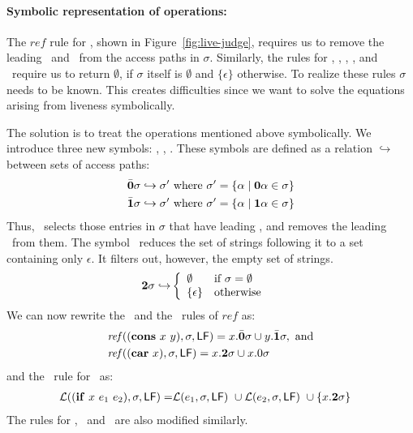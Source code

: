 \documentclass[9pt,nonatbib]{sigplanconf}
\begin{document}
\paragraph{Symbolic representation of operations:}
The   $\mathit{ref}$   rule   for   \CONS,   shown   in
Figure~\ref{fig:live-judge}, requires us  to remove the
leading  \acar\ and  \acdr\  from the  access paths  in
$\sigma$.  Similarly, the rules  for \CAR, \CDR, \PRIM,
\NULLQ, and \SIF\ require  us to return $\emptyset$, if
$\sigma$      itself       is      $\emptyset$      and
$\lbrace\epsilon\rbrace$  otherwise.  To  realize these
rules  $\sigma$   needs  to  be  known.   This  creates
difficulties  since  we  want to  solve  the  equations
arising from liveness symbolically.

The solution is to  treat the operations mentioned
above  symbolically.  We  introduce three  new symbols:
\bcar, \bcdr,  \clazy.  These symbols are  defined as a
relation  $\hookrightarrow$  between   sets  of  access
paths:
\begin{align*}
  &\bar{\mathbf{0}}\sigma \hookrightarrow \sigma' \mbox{ where } \sigma' = \{\alpha \mid \mathbf{0}\alpha \in \sigma\}\\
  &\bar{\mathbf{1}}\sigma \hookrightarrow \sigma' \mbox{ where } \sigma' = \{\alpha \mid \mathbf{1}\alpha \in \sigma\}
\end{align*}
Thus, \bcar\ selects those entries in $\sigma$ that have leading \acar, and removes the leading \acar\ from them.
The symbol \clazy\ reduces the set of strings following it to a set containing only $\epsilon$. It filters out, however, the empty set of strings.
\begin{align*}
  {\mathbf{2}}\sigma \hookrightarrow & \left\{ 
  \begin{array}{ll}
    \emptyset&\mbox{if}~\sigma = \emptyset\\
    \{\epsilon\} & \mbox{otherwise}
  \end{array}\right.
\end{align*}
We can  now rewrite the \CONS\  and the \CAR\  rules of $\mathit{ref}$
as:
\begin{align*}
&\mathit{ref\/}((\mbox{$\mathbf{cons}$}~x~y),\sigma,\mathsf{LF})
= x.\bar{\mathbf{0}}\sigma \cup y.\bar{\mathbf{1}}\sigma  \label{eqn:mod-cons},~
\mbox{and} \\
&\mathit{ref\/}((\mbox{$\mathbf{car}$}~x),\sigma,\mathsf{LF})
          =   x.{\mathbf{2}}\sigma \cup x.0\sigma
\end{align*}
and the \Lfunonly\ rule
for \SIF\ as:
\begin{align*}
\mathcal{L}((\mbox{$\mathbf{ if}$}~x~e_1~e_2),\sigma,\mathsf{LF}) =
                    &\mathcal{L}(e_1,\sigma,\mathsf{LF})~\cup
        \mathcal{L}(e_2,\sigma,\mathsf{LF})~\cup
          \{x.{\mathbf{2}} \sigma\}
\end{align*}
The rules for  \CDR, \PRIM\ and \NULLQ\ are also
modified similarly.
\end{document}
